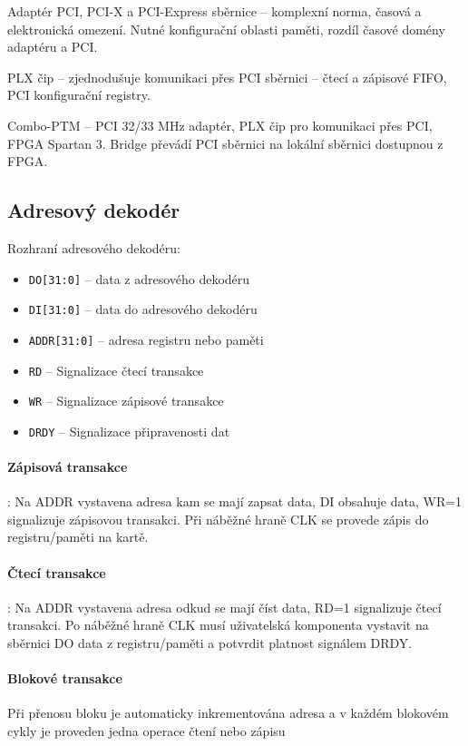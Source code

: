 \documentclass[a4paper, 11pt]{report}
\begin{document}
Adaptér PCI, PCI-X a PCI-Express sběrnice -- komplexní norma, časová a elektronická omezení. Nutné konfigurační oblasti paměti, rozdíl časové domény adaptéru a PCI.

PLX čip -- zjednodušuje komunikaci přes PCI sběrnici -- čtecí a zápisové FIFO, PCI konfigurační registry.

Combo-PTM -- PCI 32/33 MHz adaptér, PLX čip pro komunikaci přes PCI, FPGA Spartan 3. Bridge převádí PCI sběrnici na lokální sběrnici dostupnou z FPGA.

\subsection{Adresový dekodér}
Rozhraní adresového dekodéru:
\begin{itemize}
	\item \texttt{DO[31:0]} -- data z adresového dekodéru
	\item \texttt{DI[31:0]} -- data do adresového dekodéru
	\item \texttt{ADDR[31:0]} -- adresa registru nebo paměti
	\item \texttt{RD} -- Signalizace čtecí transakce
	\item \texttt{WR} -- Signalizace zápisové transakce
	\item \texttt{DRDY} -- Signalizace připravenosti dat
\end{itemize}

\paragraph{Zápisová transakce}: Na ADDR vystavena adresa kam se mají zapsat data, DI obsahuje data, WR=1 signalizuje zápisovou transakci. Při náběžné hraně CLK se provede zápis do registru/paměti na kartě.

\paragraph{Čtecí transakce}: Na ADDR vystavena adresa odkud se mají číst data, RD=1 signalizuje čtecí transakci. Po náběžné hraně CLK musí uživatelská komponenta vystavit na sběrnici DO data z registru/paměti a potvrdit platnost signálem DRDY.

\paragraph{Blokové transakce}
Při přenosu bloku je automaticky inkrementována adresa a v každém blokovém cykly je proveden jedna operace čtení nebo zápisu
\end{document}
